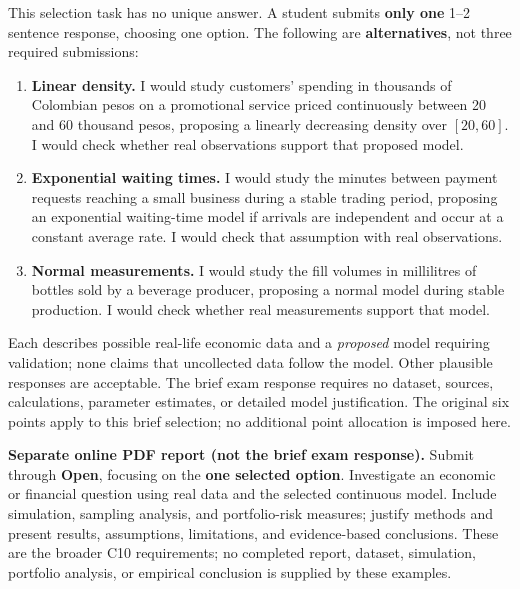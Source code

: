 {This selection task has no unique answer. A student submits \textbf{only one} 1--2 sentence response,
choosing one option. The following are \textbf{alternatives}, not three required submissions:
\begin{enumerate}[label=\textbf{(\alph*)},leftmargin=*]
\item \textbf{Linear density.} I would study customers' spending in thousands of Colombian pesos on a promotional service priced continuously between 20 and 60 thousand pesos, proposing a linearly decreasing density over $[20,60]$. I would check whether real observations support that proposed model.
\item \textbf{Exponential waiting times.} I would study the minutes between payment requests reaching a small business during a stable trading period, proposing an exponential waiting-time model if arrivals are independent and occur at a constant average rate. I would check that assumption with real observations.
\item \textbf{Normal measurements.} I would study the fill volumes in millilitres of bottles sold by a beverage producer, proposing a normal model during stable production. I would check whether real measurements support that model.
\end{enumerate}
Each describes possible real-life economic data and a \emph{proposed} model requiring validation;
none claims that uncollected data follow the model. Other plausible responses are acceptable.
The brief exam response requires no dataset, sources, calculations, parameter estimates, or detailed model justification.
The original six points apply to this brief selection; no additional point allocation is imposed here.

\textbf{Separate online PDF report (not the brief exam response).}
Submit through \textbf{Open}, focusing on the \textbf{one selected option}.
Investigate an economic or financial question using real data and the selected continuous model.
Include simulation, sampling analysis, and portfolio-risk measures; justify methods and present results,
assumptions, limitations, and evidence-based conclusions. These are the broader C10 requirements;
no completed report, dataset, simulation, portfolio analysis, or empirical conclusion is supplied by these examples.

\secInicio[sec:q17]
}


